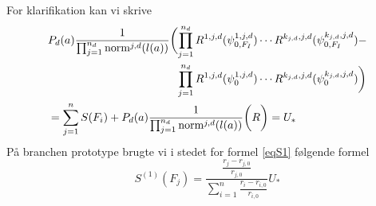 \documentclass[a4paper, 12pt]{memoir}
\begin{document}
For klarifikation kan vi skrive
\begin{align}
 &P_d(a) \frac{1}{\prod_{j=1}^{n_d}{\textup{norm}^{j,d}(l(a))}}\biggl(\begin{lgathered}[t]\prod_{j=1}^{n_d} {R^{1,j,d}(\psi_{0,F_I}^{1,j,d})  \cdots R^{k_{j,d},j,d}(\psi_{0,F_I}^{k_{j,d},j,d}) }-\\
 \prod_{j=1}^{n_d} {R^{1,j,d}(\psi_{0}^{1,j,d}) \cdots R^{k_{j,d},j,d}(\psi_{0}^{k_{j,d},j,d}) }\biggr)\end{lgathered}\\
 &=\sum_{j=1}^{n}S(F_i)+P_d(a) \frac{1}{\prod_{j=1}^{n_d}{\textup{norm}^{j,d}(l(a))}}\biggl(R\biggr)=U_{*}
\end{align}
På branchen prototype brugte vi i stedet for formel \eqref{eqS1} følgende formel
\begin{equation}
S^{(1)}(F_j)=\frac{\frac{r_j-r_{j,0}}{r_{j,0}}}{\sum_{i=1}^n\frac{r_i-r_{i,0}}{r_{i,0}}} U_{*}
\end{equation}
\end{document}
